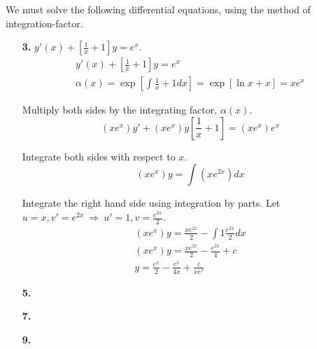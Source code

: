 
We must solve the following differential equations, using the method of integration-factor.
\begin{enumerate}
	\item[\textbf{3.}]
		\(y'(x) + \left[\frac{1}{x}+1\right]y = e^x\).
		\begin{gather*}
			y'(x) + \left[\frac{1}{x}+1\right]y = e^x\\
			\alpha (x) = \exp\left[\int \frac{1}{x}+1dx\right]
			= \exp\left[\ln x + x\right] = x e^x
		\end{gather*}

		Multiply both sides by the integrating factor, \(\alpha (x)\).
		\[(x e^x) y' + (x e^x) y \left[\frac{1}{x}+1\right] = (x e^x) e^x\]

		Integrate both sides with respect to \(x\).
		\[(x e^x) y = \int (x e^{2x})dx\]

		Integrate the right hand side using integration by parts. Let \(u = x, v' = e^{2x}\ \Rightarrow\ u' = 1, v = \frac{e^{2x}}{2}\).
		\begin{gather*}
			(x e^x) y = \frac{xe^{2x}}{2} - \int 1 \frac{e^{2x}}{2}dx\\
			(x e^x) y = \frac{xe^{2x}}{2} - \frac{e^{2x}}{4} + c\\
			y = \frac{e^x}{2} - \frac{e^{x}}{4x} + \frac{c}{x e^x}
		\end{gather*}

	\item[\textbf{5.}]


	\item[\textbf{7.}]


	\item[\textbf{9.}]


\end{enumerate}